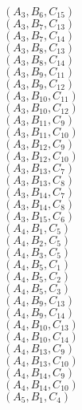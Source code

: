 \documentclass[14pt]{article}
\begin{document}
    $({A}_{3}, {B}_{6}, {C}_{15}) $ \\ 
    $({A}_{3}, {B}_{7}, {C}_{13}) $ \\ 
    $({A}_{3}, {B}_{7}, {C}_{14}) $ \\ 
    $({A}_{3}, {B}_{8}, {C}_{13}) $ \\ 
    $({A}_{3}, {B}_{8}, {C}_{14}) $ \\ 
    $({A}_{3}, {B}_{9}, {C}_{11}) $ \\ 
    $({A}_{3}, {B}_{9}, {C}_{12}) $ \\ 
    $({A}_{3}, {B}_{10}, {C}_{11}) $ \\ 
    $({A}_{3}, {B}_{10}, {C}_{12}) $ \\ 
    $({A}_{3}, {B}_{11}, {C}_{9}) $ \\ 
    $({A}_{3}, {B}_{11}, {C}_{10}) $ \\ 
    $({A}_{3}, {B}_{12}, {C}_{9}) $ \\ 
    $({A}_{3}, {B}_{12}, {C}_{10}) $ \\ 
    $({A}_{3}, {B}_{13}, {C}_{7}) $ \\ 
    $({A}_{3}, {B}_{13}, {C}_{8}) $ \\ 
    $({A}_{3}, {B}_{14}, {C}_{7}) $ \\ 
    $({A}_{3}, {B}_{14}, {C}_{8}) $ \\ 
    $({A}_{3}, {B}_{15}, {C}_{6}) $ \\ 
    $({A}_{4}, {B}_{1}, {C}_{5}) $ \\ 
    $({A}_{4}, {B}_{2}, {C}_{5}) $ \\ 
    $({A}_{4}, {B}_{3}, {C}_{5}) $ \\ 
    $({A}_{4}, {B}_{5}, {C}_{1}) $ \\ 
    $({A}_{4}, {B}_{5}, {C}_{2}) $ \\ 
    $({A}_{4}, {B}_{5}, {C}_{3}) $ \\ 
    $({A}_{4}, {B}_{9}, {C}_{13}) $ \\ 
    $({A}_{4}, {B}_{9}, {C}_{14}) $ \\ 
    $({A}_{4}, {B}_{10}, {C}_{13}) $ \\ 
    $({A}_{4}, {B}_{10}, {C}_{14}) $ \\ 
    $({A}_{4}, {B}_{13}, {C}_{9}) $ \\ 
    $({A}_{4}, {B}_{13}, {C}_{10}) $ \\ 
    $({A}_{4}, {B}_{14}, {C}_{9}) $ \\ 
    $({A}_{4}, {B}_{14}, {C}_{10}) $ \\ 
    $({A}_{5}, {B}_{1}, {C}_{4}) $ \\ 
\end{document}
